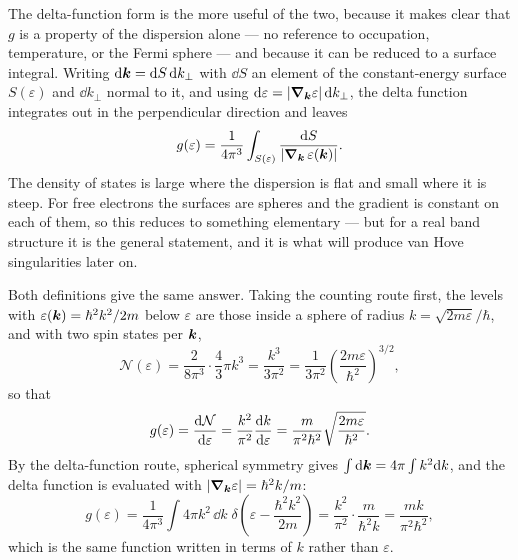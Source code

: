 The delta-function form is the more useful of the two, because it makes clear that $g$ is a property of the dispersion alone --- no reference to occupation, temperature, or the Fermi sphere --- and because it can be reduced to a surface integral. Writing $\dd\bm{k} = \dd S\,\dd k_\perp$ with $\dd S$ an element of the constant-energy surface $S(\varepsilon)$ and $\dd k_\perp$ normal to it, and using $\dd\varepsilon = |\grad_{\bm{k}}\varepsilon|\,\dd k_\perp$, the delta function integrates out in the perpendicular direction and leaves
\begin{equation}
    g(\varepsilon) = \frac{1}{4\pi^3}\int_{S(\varepsilon)} \frac{\dd S}{\left|\grad_{\bm{k}}\,\varepsilon(\bm{k})\right|}.
    \label{eq:drude-dos-surface}
\end{equation}
The density of states is large where the dispersion is flat and small where it is steep. For free electrons the surfaces are spheres and the gradient is constant on each of them, so this reduces to something elementary --- but for a real band structure it is the general statement, and it is what will produce van Hove singularities later on.

\begin{example}
Both definitions give the same answer. Taking the counting route first, the levels with $\varepsilon(\bm{k}) = \hbar^2k^2/2m$ below $\varepsilon$ are those inside a sphere of radius $k = \sqrt{2m\varepsilon}/\hbar$, and with two spin states per $\bm{k}$,
\begin{equation}
    \mathcal{N}(\varepsilon) = \frac{2}{8\pi^3}\cdot\frac{4}{3}\pi k^3 = \frac{k^3}{3\pi^2} = \frac{1}{3\pi^2}\left(\frac{2m\varepsilon}{\hbar^2}\right)^{3/2},
\end{equation}
so that
\begin{equation}
    g(\varepsilon) = \dv{\mathcal{N}}{\varepsilon} = \frac{k^2}{\pi^2}\dv{k}{\varepsilon} = \frac{m}{\pi^2\hbar^2}\sqrt{\frac{2m\varepsilon}{\hbar^2}}.
\end{equation}
By the delta-function route, spherical symmetry gives $\int\dd\bm{k} = 4\pi\int k^2\dd k$, and the delta function is evaluated with $|\grad_{\bm{k}}\varepsilon| = \hbar^2 k/m$:
\begin{equation}
    g(\varepsilon) = \frac{1}{4\pi^3}\int 4\pi k^2\,\dd k\;\delta\!\left(\varepsilon - \frac{\hbar^2k^2}{2m}\right)
    = \frac{k^2}{\pi^2}\cdot\frac{m}{\hbar^2 k} = \frac{mk}{\pi^2\hbar^2},
\end{equation}
which is the same function written in terms of $k$ rather than $\varepsilon$.
\end{example}


